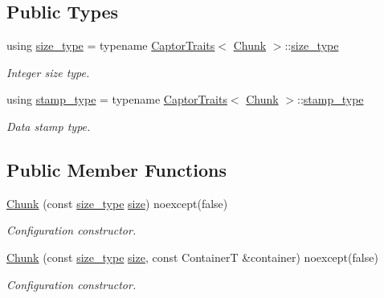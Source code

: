 \subsection*{Public Types}
\begin{DoxyCompactItemize}
\item 
\mbox{\label{classflow_1_1driver_1_1_chunk_aeab694f517dab9ae86da3369d5da57b6}} 
using \hyperlink{classflow_1_1driver_1_1_chunk_aeab694f517dab9ae86da3369d5da57b6}{size\+\_\+type} = typename \hyperlink{structflow_1_1_captor_traits}{Captor\+Traits}$<$ \hyperlink{classflow_1_1driver_1_1_chunk}{Chunk} $>$\+::\hyperlink{classflow_1_1driver_1_1_chunk_aeab694f517dab9ae86da3369d5da57b6}{size\+\_\+type}
\begin{DoxyCompactList}\small\item\em Integer size type. \end{DoxyCompactList}\item 
\mbox{\label{classflow_1_1driver_1_1_chunk_a3354862624d25cad0130065ca7299041}} 
using \hyperlink{classflow_1_1driver_1_1_chunk_a3354862624d25cad0130065ca7299041}{stamp\+\_\+type} = typename \hyperlink{structflow_1_1_captor_traits}{Captor\+Traits}$<$ \hyperlink{classflow_1_1driver_1_1_chunk}{Chunk} $>$\+::\hyperlink{classflow_1_1driver_1_1_chunk_a3354862624d25cad0130065ca7299041}{stamp\+\_\+type}
\begin{DoxyCompactList}\small\item\em Data stamp type. \end{DoxyCompactList}\end{DoxyCompactItemize}
\subsection*{Public Member Functions}
\begin{DoxyCompactItemize}
\item 
\hyperlink{classflow_1_1driver_1_1_chunk_a553b7e56f8aad7c2630e4655d8b72097}{Chunk} (const \hyperlink{classflow_1_1driver_1_1_chunk_aeab694f517dab9ae86da3369d5da57b6}{size\+\_\+type} \hyperlink{classflow_1_1_captor_interface_a1a4b3f7f6c1bd16a2cb672d90a1cbbc0}{size}) noexcept(false)
\begin{DoxyCompactList}\small\item\em Configuration constructor. \end{DoxyCompactList}\item 
\hyperlink{classflow_1_1driver_1_1_chunk_a801ccf653770947f13fd2124bf1aef41}{Chunk} (const \hyperlink{classflow_1_1driver_1_1_chunk_aeab694f517dab9ae86da3369d5da57b6}{size\+\_\+type} \hyperlink{classflow_1_1_captor_interface_a1a4b3f7f6c1bd16a2cb672d90a1cbbc0}{size}, const ContainerT \&container) noexcept(false)
\begin{DoxyCompactList}\small\item\em Configuration constructor. \end{DoxyCompactList}\end{DoxyCompactItemize}
